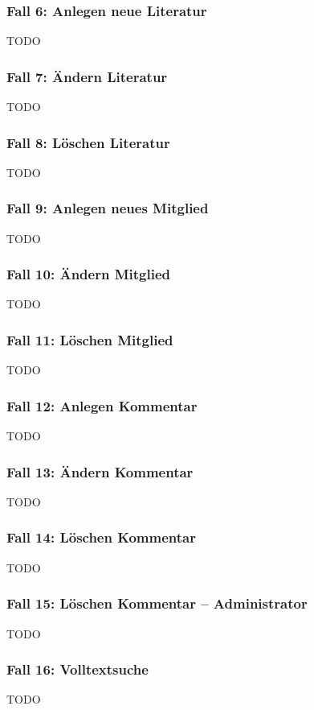 \subsubsection{Fall 6: Anlegen neue Literatur}
TODO

\subsubsection{Fall 7: Ändern Literatur}
TODO

\subsubsection{Fall 8: Löschen Literatur}
TODO

\subsubsection{Fall 9: Anlegen neues Mitglied}
TODO

\subsubsection{Fall 10: Ändern Mitglied}
TODO

\subsubsection{Fall 11: Löschen Mitglied}
TODO

\subsubsection{Fall 12: Anlegen Kommentar}
TODO

\subsubsection{Fall 13: Ändern Kommentar}
TODO

\subsubsection{Fall 14: Löschen Kommentar}
TODO

\subsubsection{Fall 15: Löschen Kommentar -- Administrator}
TODO

\subsubsection{Fall 16: Volltextsuche}
TODO

